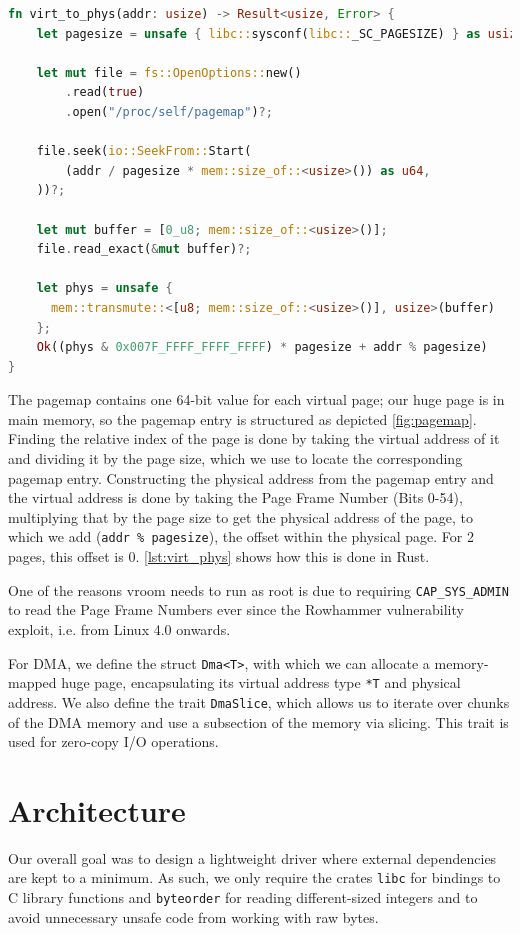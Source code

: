 \begin{lstlisting}[float, language=Rust, label=lst:virt_phys,caption=Translating a virtual address to its physical address]
fn virt_to_phys(addr: usize) -> Result<usize, Error> {
    let pagesize = unsafe { libc::sysconf(libc::_SC_PAGESIZE) } as usize;

    let mut file = fs::OpenOptions::new()
        .read(true)
        .open("/proc/self/pagemap")?;

    file.seek(io::SeekFrom::Start(
        (addr / pagesize * mem::size_of::<usize>()) as u64,
    ))?;

    let mut buffer = [0_u8; mem::size_of::<usize>()];
    file.read_exact(&mut buffer)?;

    let phys = unsafe {
      mem::transmute::<[u8; mem::size_of::<usize>()], usize>(buffer)
    };
    Ok((phys & 0x007F_FFFF_FFFF_FFFF) * pagesize + addr % pagesize)
}
\end{lstlisting}

The pagemap contains one 64-bit value for each virtual page; our huge page is in main memory, so the pagemap entry is structured as depicted \autoref{fig:pagemap}. Finding the relative index of the page is done by taking the virtual address of it and dividing it by the page size, which we use to locate the corresponding pagemap entry. Constructing the physical address from the pagemap entry and the virtual address is done by taking the Page Frame Number (Bits 0-54), multiplying that by the page size to get the physical address of the page, to which we add (\texttt{addr \% pagesize}), the offset within the physical page. For \qty{2}{\mebi\byte} pages, this offset is 0. \autoref{lst:virt_phys} shows how this is done in Rust.

One of the reasons vroom needs to run as root is due to requiring \texttt{CAP\_SYS\_ADMIN} to read the Page Frame Numbers ever since the Rowhammer vulnerability exploit, i.e. from Linux 4.0 onwards.

For DMA, we define the struct \texttt{Dma<T>}, with which we can allocate a memory-mapped huge page, encapsulating its virtual address type \texttt{*T} and physical address. We also define the trait \texttt{DmaSlice}, which allows us to iterate over chunks of the DMA memory and use a subsection of the memory via slicing. This trait is used for zero-copy I/O operations.

\section{Architecture}
Our overall goal was to design a lightweight driver where external dependencies are kept to a minimum. As such, we only require the crates \texttt{libc} for bindings to C library functions and \texttt{byteorder} for reading different-sized integers and to avoid unnecessary unsafe code from working with raw bytes.

